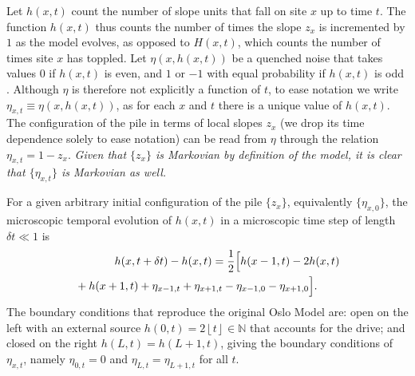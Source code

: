 \documentclass[doublecol]{epl2}
\newcommand{\etax}[1]{\eta_{x,#1}}
\newcommand{\elabel}[1]{\label{eq:#1}}
\begin{document}
 Let $h(x,t)$ count the number of slope units that fall on site $x$ up to time $t$. The function $h(x,t)$ thus counts the number of times the slope $z_x$ is incremented by $1$ as the model evolves, as opposed to $H(x,t)$, which counts the number of times  site $x$ has toppled.
  Let $\eta(x,h(x,t))$ be a quenched noise that takes values $0$ if $h(x,t)$ is even, and $1$ or $-1$ with equal probability if $h(x,t)$ is odd \cite{pruessner2003oslo}.
Although $\eta$ is therefore not explicitly a function of $t$, to ease notation
we write $\eta_{x,t}\equiv \eta(x,h(x,t))$, as for each $x$ and $t$ there
is a unique value of $h(x,t)$. The configuration of the pile in terms of local
slopes $z_x$ (we drop its time dependence solely to ease notation) can be
read from $\eta$ through the relation $\etax{t}=1-z_x$. \emph{Given that $\{z_x\}$ is Markovian by definition of the model, it is clear that $\{\eta_{x,t}\}$ is Markovian as well.}

For a given arbitrary initial configuration of the pile $\{z_x\}$, equivalently $\{\etax{0}\}$, the microscopic temporal evolution of $h(x,t)$ in a microscopic time step of length $\delta t\ll1$ is \cite{pruessner2003oslo}
\begin{eqnarray}
&&\hspace{-10pt}{h}({x,t+\delta t})-{h}({x,t}) =  \frac{1}{2}\Big[{h}({x-1,t}) - 2{h}({x,t})\Big. \nonumber\\
&& \hspace{-10pt}\Big. +{h}({x+1,t})+ \eta_{x-1,t} + \eta_{x+1,t}-\eta_{x-1,0} - \eta_{x+1,0}\Big].\qquad \elabel{eq_QEW1}
\end{eqnarray}
 The boundary conditions that reproduce the original Oslo Model \cite{ChristensenETAL:1996} are: open on the left with an external source $h(0,t)=2 \left\lfloor {t} \right\rfloor\in\mathbb{N}$ that accounts for the drive; and closed on the right $h(L,t)=h(L+1,t)$, giving the boundary conditions of $\eta_{x,t}$, namely $\eta_{0,t}=0$ and $\eta_{L,t}=\eta_{L+1,t}$ for all $t$.
\end{document}
